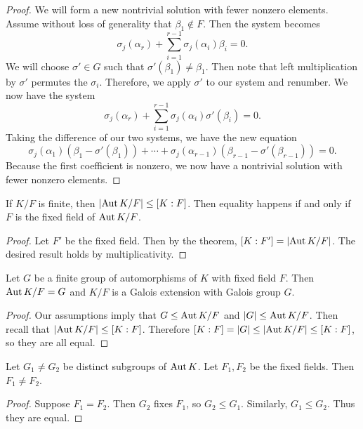 \documentclass[10pt, twoside]{article}
\begin{document}
\begin{thm}
\begin{proof}
            We will form a new nontrivial solution with fewer nonzero elements.
            Assume without loss of generality that $\beta_1 \not\in F$. Then
            the system becomes \[\sigma_j(\alpha_r) + \sum_{i=1}^{r-1}
                \sigma_j(\alpha_i) \beta_i = 0.\] We will choose $\sigma' \in
                G$ such that $\sigma'(\beta_1) \neq \beta_1$. Then note that
                left multiplication by $\sigma'$ permutes the $\sigma_i$.
                Therefore, we apply $\sigma'$ to our system and renumber. We
                now have the system \[\sigma_j(\alpha_r) + \sum_{i=1}^{r-1}
                    \sigma_j(\alpha_i) \sigma'(\beta_i) = 0.\] Taking the
                    difference of our two systems, we have the new equation
                    \[\sigma_j(\alpha_1)(\beta_1 - \sigma'(\beta_1)) + \cdots +
                    \sigma_j(\alpha_{r-1})(\beta_{r-1} - \sigma'(\beta_{r-1}))
                = 0.\] Because the first coefficient is nonzero, we now have a
            nontrivial solution with fewer nonzero elements.  \end{proof}
        \end{thm}

    \begin{cor} If $K/F$ is finite, then $\lvert\operatorname{Aut}{K/F}\rvert \leq [K:F]$. Then
        equality happens if and only if $F$ is the fixed field of $\operatorname{Aut}{K/F}$.
        \begin{proof} Let $F'$ be the fixed field. Then by the theorem, $[K:F']
            = \lvert\operatorname{Aut}{K/F}\rvert$. The desired result holds by multiplicativity.
        \end{proof} \end{cor}
    
    \begin{cor} Let $G$ be a finite group of automorphisms of $K$ with fixed
        field $F$. Then $\operatorname{Aut}{K/F} = G$ and $K/F$ is a Galois extension with
        Galois group $G$.  \begin{proof} Our assumptions imply that $G \leq
            \operatorname{Aut}{K/F}$ and $\lvert G\rvert \leq \operatorname{Aut}{K/F}$. Then recall that
            $\lvert\operatorname{Aut}{K/F}\rvert \leq [K:F]$. Therefore $[K:F] = \lvert G\rvert \leq
            \lvert\operatorname{Aut}{K/F}\rvert \leq [K:F]$, so they are all equal.  \end{proof}
        \end{cor}

    \begin{cor} Let $G_1 \neq G_2$ be distinct subgroups of $\operatorname{Aut}{K}$. Let
        $F_1,F_2$ be the fixed fields. Then $F_1 \neq F_2$.  \begin{proof}
            Suppose $F_1 = F_2$. Then $G_2$ fixes $F_1$, so $G_2 \leq G_1$.
            Similarly, $G_1 \leq G_2$. Thus they are equal.  \end{proof}
        \end{cor}
\end{document}
